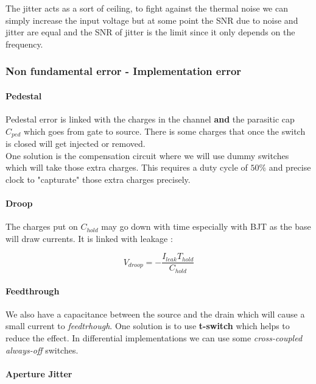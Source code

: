 \documentclass[
  a4paper,
]{article}
\begin{document}
The jitter acts as a sort of ceiling, to fight against the thermal noise
we can simply increase the input voltage but at some point the SNR due
to noise and jitter are equal and the SNR of jitter is the limit since
it only depends on the frequency.

\hypertarget{non-fundamental-error---implementation-error}{%
\subsubsection{Non fundamental error - Implementation
error}\label{non-fundamental-error---implementation-error}}

\hypertarget{pedestal}{%
\paragraph{Pedestal}\label{pedestal}}

Pedestal error is linked with the charges in the channel \textbf{and}
the parasitic cap \(C_{ped}\) which goes from gate to source. There is
some charges that once the switch is closed will get injected or
removed.\\
One solution is the compensation circuit where we will use dummy
switches which will take those extra charges. This requires a duty cycle
of \(50\%\) and precise clock to "capturate" those extra charges
precisely.

\hypertarget{droop}{%
\paragraph{Droop}\label{droop}}

The charges put on \(C_{hold}\) may go down with time especially with
BJT as the base will draw currents. It is linked with leakage :

\[V_{droop} = -\frac{I_{leak} T_{hold}}{C_{hold}}\]

\hypertarget{feedthrough}{%
\paragraph{Feedthrough}\label{feedthrough}}

We also have a capacitance between the source and the drain which will
cause a small current to \emph{feedtrhough}. One solution is to use
\textbf{t-switch} which helps to reduce the effect. In differential
implementations we can use some \emph{cross-coupled always-off}
switches.

\hypertarget{aperture-jitter}{%
\paragraph{Aperture Jitter}\label{aperture-jitter}}
\end{document}
